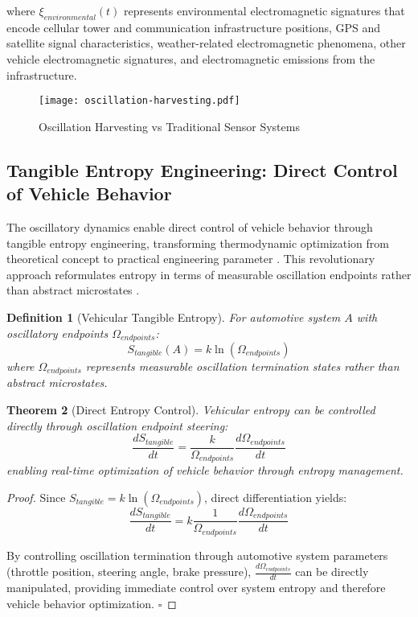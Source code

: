 \documentclass[12pt,a4paper]{article}
\newtheorem{theorem}{Theorem}[section]
\newtheorem{definition}[theorem]{Definition}
\begin{document}
where $\xi_{environmental}(t)$ represents environmental electromagnetic signatures that encode cellular tower and communication infrastructure positions, GPS and satellite signal characteristics, weather-related electromagnetic phenomena, other vehicle electromagnetic signatures, and electromagnetic emissions from the infrastructure.

\begin{figure}[H]
\centering
\texttt{[image: oscillation-harvesting.pdf]}
\caption{Oscillation Harvesting vs Traditional Sensor Systems}
\label{fig:oscillation-harvesting}
\end{figure}

\subsection{Tangible Entropy Engineering: Direct Control of Vehicle Behavior}

The oscillatory dynamics enable direct control of vehicle behavior through tangible entropy engineering, transforming thermodynamic optimization from theoretical concept to practical engineering parameter \cite{callen1985,kittel2005}. This revolutionary approach reformulates entropy in terms of measurable oscillation endpoints rather than abstract microstates \cite{shannon1948,jaynes1957}.

\begin{definition}[Vehicular Tangible Entropy]
For automotive system $A$ with oscillatory endpoints $\Omega_{endpoints}$:
\begin{equation}
S_{tangible}(A) = k \ln(\Omega_{endpoints})
\end{equation}
where $\Omega_{endpoints}$ represents measurable oscillation termination states rather than abstract microstates.
\end{definition}

\begin{theorem}[Direct Entropy Control]
Vehicular entropy can be controlled directly through oscillation endpoint steering:
\begin{equation}
\frac{dS_{tangible}}{dt} = \frac{k}{\Omega_{endpoints}} \frac{d\Omega_{endpoints}}{dt}
\end{equation}
enabling real-time optimization of vehicle behavior through entropy management.
\end{theorem}

\begin{proof}
Since $S_{tangible} = k \ln(\Omega_{endpoints})$, direct differentiation yields:
\begin{equation}
\frac{dS_{tangible}}{dt} = k \frac{1}{\Omega_{endpoints}} \frac{d\Omega_{endpoints}}{dt}
\end{equation}

By controlling oscillation termination through automotive system parameters (throttle position, steering angle, brake pressure), $\frac{d\Omega_{endpoints}}{dt}$ can be directly manipulated, providing immediate control over system entropy and therefore vehicle behavior optimization. $\square$
\end{proof}
\end{document}
